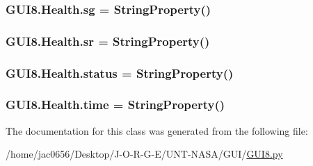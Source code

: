 \subsubsection[{\texorpdfstring{sg}{sg}}]{\setlength{\rightskip}{0pt plus 5cm}G\+U\+I8.\+Health.\+sg = String\+Property()\hspace{0.3cm}{\ttfamily [static]}}\hypertarget{classGUI8_1_1Health_a8d847a1f3db5ef07ae447de48eb27a7a}{}\label{classGUI8_1_1Health_a8d847a1f3db5ef07ae447de48eb27a7a}
\subsubsection[{\texorpdfstring{sr}{sr}}]{\setlength{\rightskip}{0pt plus 5cm}G\+U\+I8.\+Health.\+sr = String\+Property()\hspace{0.3cm}{\ttfamily [static]}}\hypertarget{classGUI8_1_1Health_a1c95aff816745a8727529768e6de6fdf}{}\label{classGUI8_1_1Health_a1c95aff816745a8727529768e6de6fdf}
\subsubsection[{\texorpdfstring{status}{status}}]{\setlength{\rightskip}{0pt plus 5cm}G\+U\+I8.\+Health.\+status = String\+Property()\hspace{0.3cm}{\ttfamily [static]}}\hypertarget{classGUI8_1_1Health_a51e3464840e9630763299d492a988b12}{}\label{classGUI8_1_1Health_a51e3464840e9630763299d492a988b12}
\subsubsection[{\texorpdfstring{time}{time}}]{\setlength{\rightskip}{0pt plus 5cm}G\+U\+I8.\+Health.\+time = String\+Property()\hspace{0.3cm}{\ttfamily [static]}}\hypertarget{classGUI8_1_1Health_a70f5dedaa1d04590be02c340943fa8e4}{}\label{classGUI8_1_1Health_a70f5dedaa1d04590be02c340943fa8e4}


The documentation for this class was generated from the following file\+:\begin{DoxyCompactItemize}
\item 
/home/jac0656/\+Desktop/\+J-\/\+O-\/\+R-\/\+G-\/\+E/\+U\+N\+T-\/\+N\+A\+S\+A/\+G\+U\+I/\hyperlink{GUI_2GUI8_8py}{G\+U\+I8.\+py}\end{DoxyCompactItemize}
